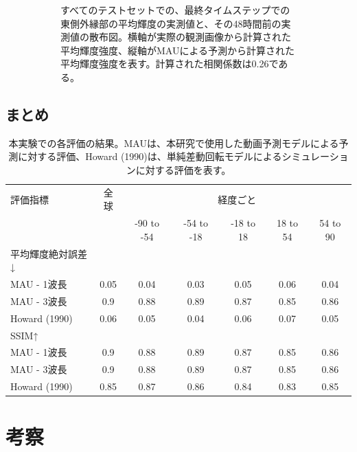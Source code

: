 \begin{figure}[htbp]
\begin{subfigure}[b]{0.55\textwidth}
            \caption{すべてのテストセットでの、最終タイムステップでの東側外縁部の平均輝度の実測値と、その48時間前の実測値の散布図。横軸が実際の観測画像から計算された平均輝度強度、縦軸がMAUによる予測から計算された平均輝度強度を表す。計算された相関係数は0.26である。}
          \end{subfigure}
          \caption{}
          \label{fig:exp2_limb_scatter}
        \end{figure}
        
    \subsection{まとめ}
      \begin{table}[htbp]
        \centering
        \caption{本実験での各評価の結果。MAUは、本研究で使用した動画予測モデルによる予測に対する評価、Howard (1990)は、単純差動回転モデルによるシミュレーションに対する評価を表す。}
        \begin{tabular}{lcccccc}
        \hline
        評価指標 & 全球 & \multicolumn{5}{c}{経度ごと} \\
        \cline{3-7}
         &  & -90 to -54 & -54 to -18 & -18 to 18 & 18 to 54 & 54 to 90 \\
        \hline\hline
        平均輝度絶対誤差↓ & & & & & & \\
        \quad MAU - 1波長 & 0.05 & 0.04 & 0.03 & 0.05 & 0.06 & 0.04 \\
        \quad MAU - 3波長 & 0.9 & 0.88 & 0.89 & 0.87 & 0.85 & 0.86 \\
        \quad Howard (1990) & 0.06 & 0.05 & 0.04 & 0.06 & 0.07 & 0.05 \\
        \hline
        SSIM↑ & & & & & & \\
        \quad MAU - 1波長 & 0.9 & 0.88 & 0.89 & 0.87 & 0.85 & 0.86 \\
        \quad MAU - 3波長 & 0.9 & 0.88 & 0.89 & 0.87 & 0.85 & 0.86 \\
        \quad Howard (1990) & 0.85 & 0.87 & 0.86 & 0.84 & 0.83 & 0.85 \\
        \hline
        \end{tabular}
        \label{tab:exp2_result}
      \end{table}


  \section{考察}
